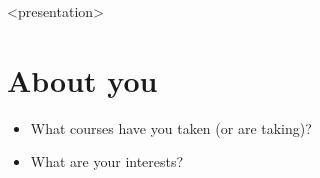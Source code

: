 %
%
%


\begin{onlyenv}<presentation>
\section{About you}

\begin{frame}[fragile]
  \begin{question}
    \begin{itemize}
      \item What courses have you taken (or are taking)?
      \item What are your interests?
    \end{itemize}
  \end{question}
\end{frame}
\end{onlyenv}



